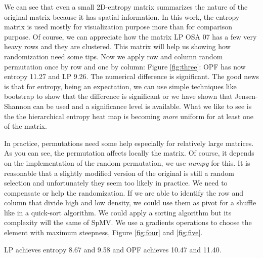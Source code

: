 \documentclass[manuscript,screen]{acmart}
\begin{document}

We can see that even a small 2D-entropy matrix summarizes the nature
of the original matrix because it has spatial information. In this
work, the entropy matrix is used mostly for visualization purpose more
than for comparison purpose. Of course, we can appreciate how the
matrix LP OSA 07 has a few very heavy rows and they are
clustered. This matrix will help us showing how randomization need
some tips. Now we apply row and column random permutation once by row
and one by column: Figure \ref{fig:three}: OPF has now entropy 11.27
and LP 9.26. The numerical difference is significant. The good news is
that for entropy, being an expectation, we can use simple techniques
like bootstrap to show that the difference is significant or we have
shown that Jensen-Shannon can be used and a significance level is
available. What we like to see is the the hierarchical entropy heat
map is becoming {\em more} uniform for at least one of the matrix.


In practice, permutations need some help especially for relatively
large matrices. As you can see, the permutation affects locally the
matrix. Of course, it depends on the implementation of the random
permutation, we use {\em numpy} for this. It is reasonable that a
slightly modified version of the original is still a random selection
and unfortunately they seem too likely in practice. We need to
compensate or help the randomization. If we are able to identify the
row and column that divide high and low density, we could use them as
pivot for a shuffle like in a quick-sort algorithm. We could apply a
sorting algorithm but its complexity will the same of SpMV. We use a
gradients operations to choose the element with maximum steepness,
Figure \ref{fig:four} and \ref{fig:five}.

LP achieves entropy 8.67 and 9.58 and OPF achieves 10.47 and 11.40.

\end{document}
